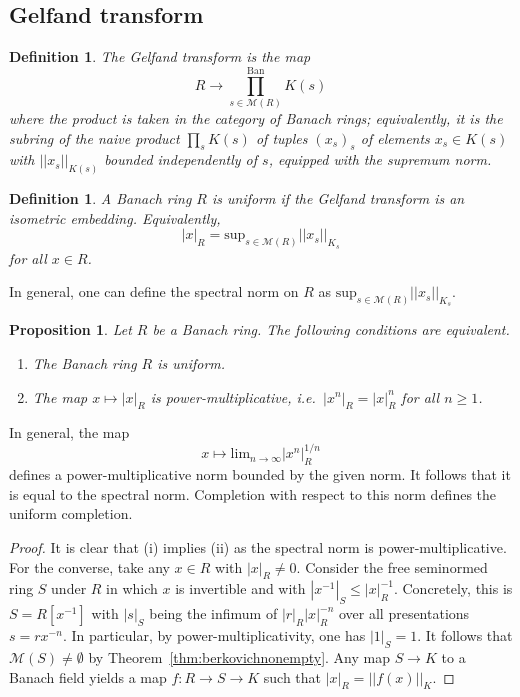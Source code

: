 \documentclass[11pt]{amsart}
\numberwithin{equation}{section}
\numberwithin{theorem}{section}
\newtheorem{proposition}[theorem]{Proposition}
\newtheorem{definition}[theorem]{Definition}
\theoremstyle{definition}
\begin{document}
\subsection{Gelfand transform}

\begin{definition} The Gelfand transform is the map
\[
R\to \prod_{s\in \mathcal M(R)}^{\mathrm{Ban}} K(s)
\]
where the product is taken in the category of Banach rings; equivalently, it is the subring of the naive product $\prod_s K(s)$ of tuples $(x_s)_s$ of elements $x_s\in K(s)$ with $||x_s||_{K(s)}$ bounded independently of $s$, equipped with the supremum norm.
\end{definition}

\begin{definition}\label{def:uniform} A Banach ring $R$ is uniform if the Gelfand transform is an isometric embedding. Equivalently,
\[
|x|_R = \mathrm{sup}_{s\in \mathcal M(R)} ||x_s||_{K_s}
\]
for all $x\in R$.
\end{definition}

In general, one can define the spectral norm on $R$ as $\mathrm{sup}_{s\in \mathcal M(R)} ||x_s||_{K_s}$.

\begin{proposition} Let $R$ be a Banach ring. The following conditions are equivalent.
\begin{enumerate}
\item[{\rm (i)}] The Banach ring $R$ is uniform.
\item[{\rm (ii)}] The map $x\mapsto |x|_R$ is power-multiplicative, i.e.~$|x^n|_R = |x|^n_R$ for all $n\geq 1$.
\end{enumerate}
\end{proposition}

In general, the map
\[
x\mapsto \mathrm{lim}_{n\to \infty} |x^n|^{1/n}_R
\]
defines a power-multiplicative norm bounded by the given norm. It follows that it is equal to the spectral norm. Completion with respect to this norm defines the uniform completion.

\begin{proof} It is clear that (i) implies (ii) as the spectral norm is power-multiplicative. For the converse, take any $x\in R$ with $|x|_R\neq 0$. Consider the free seminormed ring $S$ under $R$ in which $x$ is invertible and with $|x^{-1}|_S\leq |x|_R^{-1}$. Concretely, this is $S=R[x^{-1}]$ with $|s|_S$ being the infimum of $|r|_R |x|_R^{-n}$ over all presentations $s=rx^{-n}$. In particular, by power-multiplicativity, one has $|1|_S = 1$. It follows that $\mathcal M(S)\neq \emptyset$ by Theorem~\ref{thm:berkovichnonempty}. Any map $S\to K$ to a Banach field yields a map $f: R\to S\to K$ such that $|x|_R = ||f(x)||_K$.
\end{proof}
\end{document}

